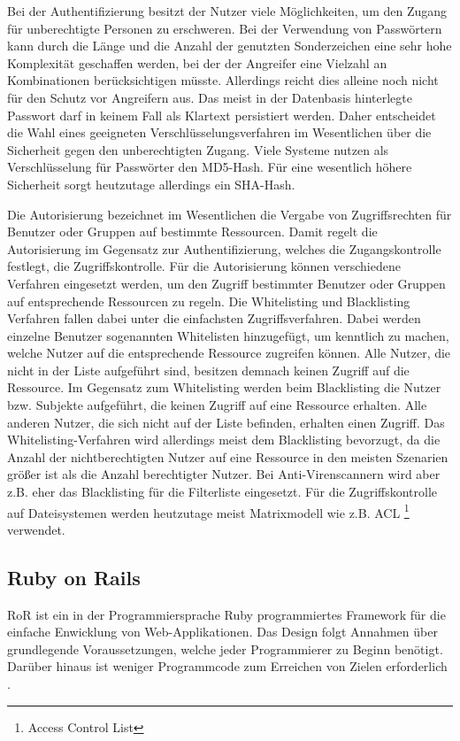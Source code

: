 Bei der Authentifizierung besitzt der Nutzer viele Möglichkeiten, um den Zugang
für unberechtigte Personen zu erschweren. Bei der Verwendung von Passwörtern
kann durch die Länge und die Anzahl der genutzten Sonderzeichen eine sehr hohe
Komplexität geschaffen werden, bei der der Angreifer eine Vielzahl an
Kombinationen berücksichtigen müsste. Allerdings reicht dies alleine noch nicht
für den Schutz vor Angreifern aus. Das meist in der Datenbasis hinterlegte
Passwort darf in keinem Fall als Klartext persistiert werden. Daher entscheidet
die Wahl eines geeigneten Verschlüsselungsverfahren im
Wesentlichen über die Sicherheit gegen den unberechtigten Zugang. Viele Systeme
nutzen als Verschlüsselung für Passwörter den MD5-Hash. Für eine
wesentlich höhere Sicherheit sorgt heutzutage allerdings ein SHA-Hash.

Die Autorisierung bezeichnet im Wesentlichen die Vergabe von Zugriffsrechten für
Benutzer oder Gruppen auf bestimmte Ressourcen. Damit regelt die Autorisierung
im Gegensatz zur Authentifizierung, welches die Zugangskontrolle festlegt, die
Zugriffskontrolle. Für die Autorisierung können verschiedene Verfahren
eingesetzt werden, um den Zugriff bestimmter Benutzer oder Gruppen auf
entsprechende Ressourcen zu regeln. Die Whitelisting und Blacklisting
Verfahren fallen dabei unter die einfachsten Zugriffsverfahren. Dabei werden
einzelne Benutzer sogenannten Whitelisten hinzugefügt, um kenntlich zu machen,
welche Nutzer auf die entsprechende Ressource zugreifen können. Alle Nutzer, die
nicht in der Liste aufgeführt sind, besitzen demnach keinen Zugriff auf die
Ressource. Im Gegensatz zum Whitelisting werden beim Blacklisting die Nutzer
bzw. Subjekte aufgeführt, die keinen Zugriff auf eine Ressource erhalten. Alle
anderen Nutzer, die sich nicht auf der Liste befinden, erhalten einen Zugriff.
Das Whitelisting-Verfahren wird allerdings meist dem Blacklisting bevorzugt, da
die Anzahl der nichtberechtigten Nutzer auf eine Ressource in den meisten
Szenarien größer ist als die Anzahl berechtigter Nutzer. Bei Anti-Virenscannern
wird aber z.B. eher das Blacklisting für die Filterliste eingesetzt.
Für die Zugriffskontrolle auf Dateisystemen werden heutzutage meist 
Matrixmodell wie z.B. ACL \footnote{Access Control List} verwendet.

\subsection{Ruby on Rails}
\ac{RoR} ist ein in der Programmiersprache Ruby programmiertes Framework für die
einfache Enwicklung von Web-Applikationen. Das Design folgt Annahmen über
grundlegende Voraussetzungen, welche jeder Programmierer zu Beginn benötigt.
Darüber hinaus ist weniger Programmcode zum Erreichen von Zielen
erforderlich \cite{railsGuides:2013}.

